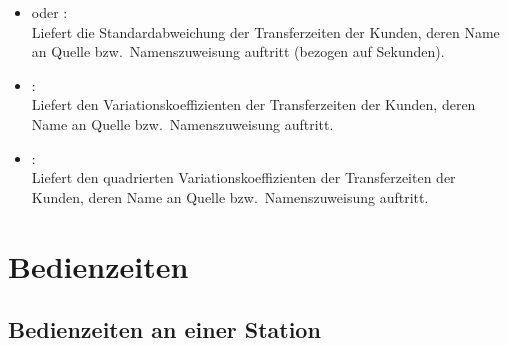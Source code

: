 \begin{itemize}
\item
{} oder :\\
Liefert die Standardabweichung der Transferzeiten der Kunden, deren Name an Quelle bzw.\ Namenszuweisung  auftritt (bezogen auf Sekunden).

\item
{}:\\
Liefert den Variationskoeffizienten der Transferzeiten der Kunden, deren Name an Quelle bzw.\ Namenszuweisung  auftritt.

\item
{}:\\
Liefert den quadrierten Variationskoeffizienten der Transferzeiten der Kunden, deren Name an Quelle bzw.\ Namenszuweisung  auftritt.

\end{itemize}



\section{Bedienzeiten}



\subsection{Bedienzeiten an einer Station}

